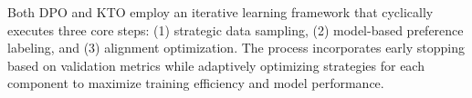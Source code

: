 Both DPO and KTO employ an iterative learning framework that cyclically executes three core steps: (1) strategic data sampling, (2) model-based preference labeling, and (3) alignment optimization. The process incorporates early stopping based on validation metrics while adaptively optimizing strategies for each component to maximize training efficiency and model performance.